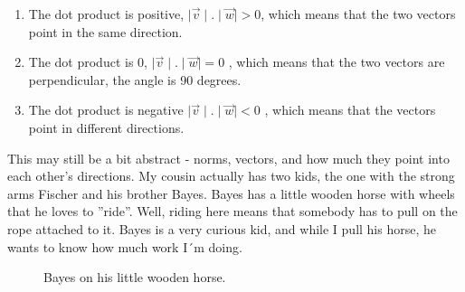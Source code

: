 \documentclass[a4,12pt,twosided,openany]{memoir}
\begin{document}
\begin{tcolorbox}
\begin{enumerate}
\item The dot product is positive,  $\mid \overrightarrow{v} \mid.\mid \overrightarrow{w}\mid>0$, which means that the two vectors point in the same direction.
\item The dot product is 0,  $\mid \overrightarrow{v} \mid.\mid \overrightarrow{w}\mid = 0$  , which means that the two vectors are perpendicular, the angle is 90 degrees.
\item The dot product is negative  $\mid \overrightarrow{v} \mid.\mid \overrightarrow{w}\mid<0$ , which means that the vectors point in different directions.
\end{enumerate}
\end{tcolorbox}

This may still be a bit abstract - norms, vectors, and how much they point into each other’s directions. My cousin actually has two kids, the one with the strong arms Fischer and his brother Bayes. Bayes has a little wooden horse with wheels that he loves to ”ride”. Well, riding here means that somebody has to pull on the rope attached to it. Bayes is a very curious kid, and while I pull his horse, he wants to know how much work I´m doing.

\begin{figure}[h!]
\begin{center}
\end{center}
\caption{Bayes on his little wooden horse.}
\end{figure}
\end{document}
